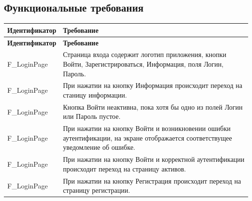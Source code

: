 \documentclass[a4paper, 14pt]{article}
\begin{document}
\subsection{Функциональные требования}

\begin{longtable}{| p{} | p{} |}
    \hline
    \textbf{Идентификатор}       & \textbf{Требование}                                                                                                                                                 \\
    \hline
    \endfirsthead
    \hline
    \textbf{Идентификатор}       & \textbf{Требование}                                                                                                                                                 \\
    \hline
    \endhead


    F\_LoginPage                 & Страница входа содержит логотип приложения, кнопки Войти, Зарегистрироваться, Информация, поля Логин, Пароль.                                                       \\ \hline
    F\_LoginPage                 & При нажатии на кнопку Информация происходит переход на станицу информации.                                                                                          \\ \hline
    F\_LoginPage                 & Кнопка Войти неактивна, пока хотя бы одно из полей Логин или Пароль пустое.                                                                                         \\ \hline
    F\_LoginPage                 & При нажатии на кнопку Войти и возникновении ошибки аутентификации, на экране отображается соответствущее уведомление об ошибке.                                     \\ \hline
    F\_LoginPage                 & При нажатии на кнопку Войти и корректной аутентификации происходит переход на страницу активов.                                                                     \\ \hline
    F\_LoginPage                 & При нажатии на кнопку Регистрация происходит переход на страницу регистрации.                                                                                       \\ \hline


\end{longtable}
\end{document}
